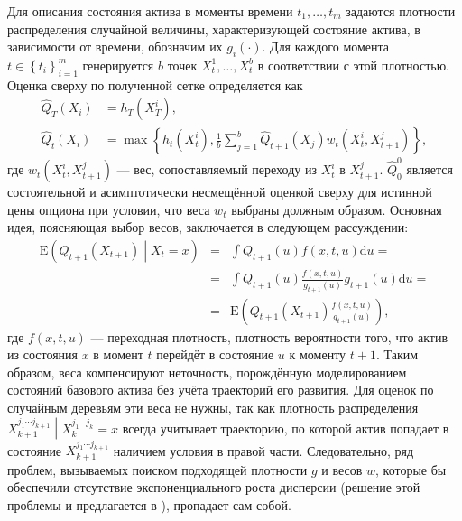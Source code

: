 \documentclass[specialist,
               substylefile = ../spbu.rtx,
               subf,href,colorlinks=true, 12pt]{disser}
\newcommand{\ev}{\mathrm{E}}
\begin{document}
	Для описания состояния актива в моменты времени $t_1, \ldots, t_m$ задаются плотности распределения случайной величины, характеризующей состояние актива, в зависимости от времени, обозначим их $g_i\left(\cdot\right)$. Для каждого момента $t\in\left\lbrace t_i\right\rbrace_{i=1}^m$ генерируется $b$ точек $X_t^1, \ldots, X_t^b$ в соответствии с этой плотностью. Оценка сверху по полученной сетке определяется как 
	\begin{equation} \begin{aligned}
		\hat Q_T\left(X_i\right) &= h_T\left(X_T^i\right), \\
		\hat Q_t\left(X_i\right) &= \max\left\lbrace h_t\left(X_t^i\right), \frac{1}{b}\sum_{j=1}^b\hat Q_{t+1}\left(X_j\right) w_t\left(X_t^i, X_{t+1}^j\right) \right\rbrace,
	\end{aligned}
	\end{equation}
	где $w_t\left(X_t^i, X_{t+1}^j\right)$ --- вес, сопоставляемый переходу из $X_t^i$ в $X_{t+1}^j$. $\hat Q_0^0$ является состоятельной и асимптотически несмещённой оценкой сверху для истинной цены опциона при условии, что веса $w_t$ выбраны должным образом. Основная идея, поясняющая выбор весов, заключается в следующем рассуждении:
	\begin{eqnarray*}
	\ev\left(Q_{t+1}\left(X_{t+1}\right)\middle\vert X_t = x\right) &=& \int Q_{t+1}\left(u\right)f\left(x,t,u\right)\mathrm d u = \\
		&=& \int Q_{t+1}\left(u\right)\frac{f\left(x,t,u\right)}{g_{t+1}\left(u\right)} g_{t+1}\left(u\right)\mathrm d u = \\
		&=& \ev\left(Q_{t+1}\left(X_{t+1}\right)\frac{f\left(x,t,u\right)}{g_{t+1}\left(u\right)}\right),
	\end{eqnarray*}
	где $f\left(x, t, u\right)$ --- переходная плотность, плотность вероятности того, что актив из состояния $x$ в момент $t$ перейдёт в состояние $u$ к моменту $t+1$. Таким образом, веса компенсируют неточность, порождённую моделированием состояний базового актива без учёта траекторий его развития. Для оценок по случайным деревьям эти веса не нужны, так как плотность распределения $\left.X_{k+1}^{j_1\cdots j_{k+1}}\middle\vert X_k^{j_1\cdots j_k} = x\right.$ всегда учитывает траекторию, по которой актив попадает в состояние $X_{k+1}^{j_1\cdots j_{k+1}}$ наличием условия в правой части. Следовательно, ряд проблем, вызываемых поиском подходящей плотности $g$ и весов $w$, которые бы обеспечили отсутствие экспоненциального роста дисперсии (решение этой проблемы и предлагается в \cite{Kashtanov2015}), пропадает сам собой.
\end{document}
